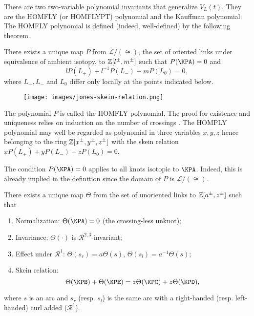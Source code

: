 There are two two-variable polynomial invariants that generalize $V_L(t)$. They are the HOMFLY (or HOMFLYPT) polynomial and the Kauffman polynomial. The HOMFLY polynomial is defined (indeed, well-defined) by the following theorem.

\begin{theodef}
\label{cha:jones-polynomial-19}
There exists a unique map $P$ from $\mathcal{L}/(\cong)$, the set of oriented links under equivalence of ambient isotopy, to $\mathbb{Z}[l^{\pm}, m^{\pm}]$ such that $P(\KPA) = 0$ and 
\begin{equation}
\label{eq:5}
lP(L_+) + l^{-1}P(L_-) + mP(L_0) = 0,
\end{equation}
where $L_+, L_-$ and $L_0$ differ only locally at the points indicated below.
\begin{figure}[h]
  \centering
  \texttt{[image: images/jones-skein-relation.png]}
\end{figure}
\end{theodef}
The polynomial $P$ is called the HOMFLY polynomial. The proof for existence and uniqueness relies on induction on the number of crossings \cite{lickorish1997}. The HOMPLY polynomial may well be regarded as polynomial in three variables $x,y,z$ hence belonging to the ring $\mathbb{Z}[x^{\pm}, y^{\pm}, z^{\pm}]$ with the skein relation $xP(L_+) + yP(L_-) + zP(L_0) = 0$.

\begin{remark}
The condition $P(\KPA) = 0$ applies to all knots isotopic to $\KPA$. Indeed, this is already implied in the definition since the domain of $P$ is $\mathcal{L}/(\cong)$.
\end{remark}

\begin{theorem}
\label{cha:jones-polynomial-18}
There exists a unique map $\Theta$ from the set of unoriented links to $\mathbb{Z}[a^{\pm}, z^{\pm}]$ such that 
\begin{enumerate}[font=\upshape]
\item\label{item:1} Normalization: $\Theta(\KPA) = 0$ (the crossing-less unknot);
\item\label{item:2} Invariance: $\Theta(\cdot)$ is $\mathcal{R}^{2,3}$-invariant; 
\item\label{item:3} Effect under $\mathcal{R}^1$: $\Theta(s_r) = a\Theta(s)$, $\Theta(s_l) = a^{-1}\Theta(s)$; 
\item\label{item:4} Skein relation: 
\begin{equation}
\label{3:eq:6}
\Theta(\KPB) + \Theta(\KPE) = z\Theta(\KPC) + z\Theta(\KPD),
\end{equation}
\end{enumerate}
where $s$ is an arc and $s_r$ (resp. $s_l$) is the same arc with a right-handed (resp. left-handed) curl added ($\mathcal{R}^1$).
\end{theorem}

